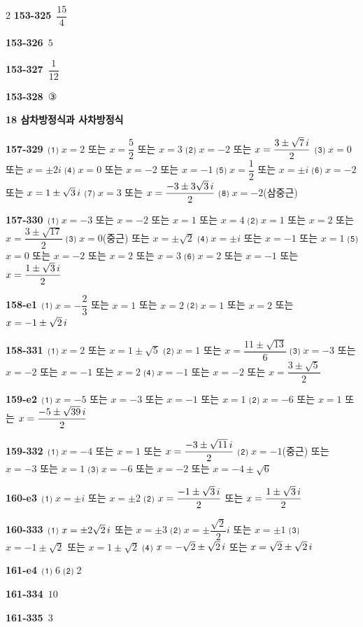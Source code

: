 \documentclass[10pt,a4paper]{article}
\begin{document}
\begin{multicols}{2}
\noindent\textbf{153-325}\ $\dfrac{15}{4}$\par
\noindent\textbf{153-326}\ $5$\par
\noindent\textbf{153-327}\ $\dfrac{1}{12}$\par
\noindent\textbf{153-328}\ ③\par
\noindent\textbf{18 삼차방정식과 사차방정식}\par\smallskip
\noindent\textbf{157-329}\ ⑴ $x=2$ 또는 $x=\dfrac{5}{2}$ 또는 $x=3$ ⑵ $x=-2$ 또는 $x=\dfrac{3\pm\sqrt{7}\mkern3mu i}{2}$ ⑶ $x=0$ 또는 $x=\pm 2i$ ⑷ $x=0$ 또는 $x=-2$ 또는 $x=-1$ ⑸ $x=\dfrac{1}{2}$ 또는 $x=\pm i$ ⑹ $x=-2$ 또는 $x=1\pm\sqrt{3}\mkern3mu i$ ⑺ $x=3$ 또는 $x=\dfrac{-3\pm 3\sqrt{3}\mkern3mu i}{2}$ ⑻ $x=-2$(삼중근)\par
\noindent\textbf{157-330}\ ⑴ $x=-3$ 또는 $x=-2$ 또는 $x=1$ 또는 $x=4$ ⑵ $x=1$ 또는 $x=2$ 또는 $x=\dfrac{3\pm\sqrt{17}}{2}$ ⑶ $x=0$(중근) 또는 $x=\pm\sqrt{2}$ ⑷ $x=\pm i$ 또는 $x=-1$ 또는 $x=1$ ⑸ $x=0$ 또는 $x=-2$ 또는 $x=2$ 또는 $x=3$ ⑹ $x=2$ 또는 $x=-1$ 또는 $x=\dfrac{1\pm\sqrt{3}\mkern3mu i}{2}$\par
\noindent\textbf{158-e1}\ ⑴ $x=-\dfrac{2}{3}$ 또는 $x=1$ 또는 $x=2$ ⑵ $x=1$ 또는 $x=2$ 또는 $x=-1\pm\sqrt{2}\mkern3mu i$\par
\noindent\textbf{158-331}\ ⑴ $x=2$ 또는 $x=1\pm\sqrt{5}$ ⑵ $x=1$ 또는 $x=\dfrac{11\pm\sqrt{13}}{6}$ ⑶ $x=-3$ 또는 $x=-2$ 또는 $x=-1$ 또는 $x=2$ ⑷ $x=-1$ 또는 $x=-2$ 또는 $x=\dfrac{3\pm\sqrt{5}}{2}$\par
\noindent\textbf{159-e2}\ ⑴ $x=-5$ 또는 $x=-3$ 또는 $x=-1$ 또는 $x=1$ ⑵ $x=-6$ 또는 $x=1$ 또는 $x=\dfrac{-5\pm\sqrt{39}\mkern3mu i}{2}$\par
\noindent\textbf{159-332}\ ⑴ $x=-4$ 또는 $x=1$ 또는 $x=\dfrac{-3\pm\sqrt{11}\mkern3mu i}{2}$ ⑵ $x=-1$(중근) 또는 $x=-3$ 또는 $x=1$ ⑶ $x=-6$ 또는 $x=-2$ 또는 $x=-4\pm\sqrt{6}$\par
\noindent\textbf{160-e3}\ ⑴ $x=\pm i$ 또는 $x=\pm 2$ ⑵ $x=\dfrac{-1\pm\sqrt{3}\mkern3mu i}{2}$ 또는 $x=\dfrac{1\pm\sqrt{3}\mkern3mu i}{2}$\par
\noindent\textbf{160-333}\ ⑴ $x=\pm 2\sqrt{2}\mkern3mu i$ 또는 $x=\pm 3$ ⑵ $x=\pm\dfrac{\sqrt{2}}{2}i$ 또는 $x=\pm 1$ ⑶ $x=-1\pm\sqrt{2}$ 또는 $x=1\pm\sqrt{2}$ ⑷ $x=-\sqrt{2}\pm\sqrt{2}\mkern3mu i$ 또는 $x=\sqrt{2}\pm\sqrt{2}\mkern3mu i$\par
\noindent\textbf{161-e4}\ ⑴ $6$ ⑵ $2$\par
\noindent\textbf{161-334}\ $10$\par
\noindent\textbf{161-335}\ $3$\par

\end{multicols}
\end{document}
